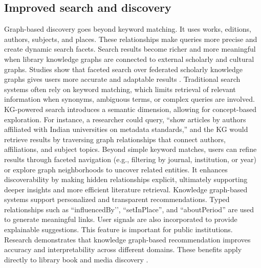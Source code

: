 \documentclass[12pt,a4paper]{article}
\begin{document}
\subsection{Improved search and discovery}
Graph-based discovery goes beyond keyword matching. It uses works, editions, authors, subjects, and places. These relationships make queries more precise and create dynamic search facets. Search results become richer and more meaningful when library knowledge graphs are connected to external scholarly and cultural graphs. Studies show that faceted search over federated scholarly knowledge graphs gives users more accurate and adaptable results \cite{heidari2021federation}. Traditional search systems often rely on keyword matching, which limits retrieval of relevant information when synonyms, ambiguous terms, or complex queries are involved. KG-powered search introduces a semantic dimension, allowing for concept-based exploration. For instance, a researcher could query, ``show articles by authors affiliated with Indian universities on metadata standards,'' and the KG would retrieve results by traversing graph relationships that connect authors, affiliations, and subject topics. Beyond simple keyword matches, users can refine results through faceted navigation (e.g., filtering by journal, institution, or year) or explore graph neighborhoods to uncover related entities. It enhances discoverability by making hidden relationships explicit, ultimately supporting deeper insights and more efficient literature retrieval. Knowledge graph-based systems support personalized and transparent recommendations. Typed relationships such as ``influencedBy’’, “setInPlace”, and “aboutPeriod” are used to generate meaningful links. User signals are also incorporated to provide explainable suggestions. This feature is important for public institutions. Research demonstrates that knowledge graph-based recommendation improves accuracy and interpretability across different domains. These benefits apply directly to library book and media discovery \cite{hahn2020data}.
\end{document}
